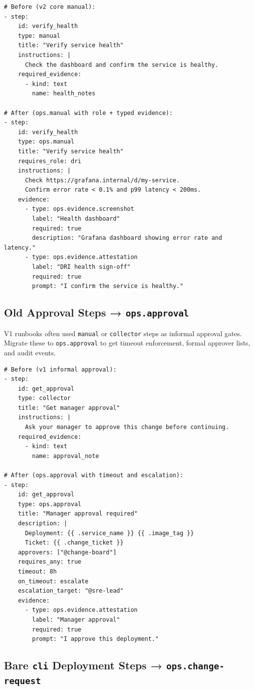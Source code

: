 \begin{verbatim}
# Before (v2 core manual):
- step:
    id: verify_health
    type: manual
    title: "Verify service health"
    instructions: |
      Check the dashboard and confirm the service is healthy.
    required_evidence:
      - kind: text
        name: health_notes

# After (ops.manual with role + typed evidence):
- step:
    id: verify_health
    type: ops.manual
    title: "Verify service health"
    requires_role: dri
    instructions: |
      Check https://grafana.internal/d/my-service.
      Confirm error rate < 0.1% and p99 latency < 200ms.
    evidence:
      - type: ops.evidence.screenshot
        label: "Health dashboard"
        required: true
        description: "Grafana dashboard showing error rate and latency."
      - type: ops.evidence.attestation
        label: "DRI health sign-off"
        required: true
        prompt: "I confirm the service is healthy."
\end{verbatim}

\subsection{Old Approval Steps → \texttt{ops.approval}}

V1 runbooks often used \texttt{manual} or \texttt{collector} steps as informal approval gates.
Migrate these to \texttt{ops.approval} to get timeout enforcement, formal approver lists, and
audit events.

\begin{verbatim}
# Before (v1 informal approval):
- step:
    id: get_approval
    type: collector
    title: "Get manager approval"
    instructions: |
      Ask your manager to approve this change before continuing.
    required_evidence:
      - kind: text
        name: approval_note

# After (ops.approval with timeout and escalation):
- step:
    id: get_approval
    type: ops.approval
    title: "Manager approval required"
    description: |
      Deployment: {{ .service_name }} {{ .image_tag }}
      Ticket: {{ .change_ticket }}
    approvers: ["@change-board"]
    requires_any: true
    timeout: 8h
    on_timeout: escalate
    escalation_target: "@sre-lead"
    evidence:
      - type: ops.evidence.attestation
        label: "Manager approval"
        required: true
        prompt: "I approve this deployment."
\end{verbatim}

\subsection{Bare \texttt{cli} Deployment Steps → \texttt{ops.change-request}}

